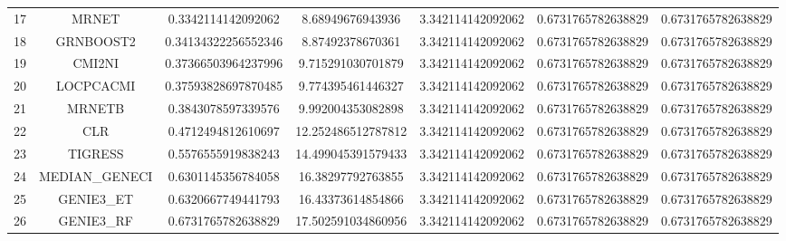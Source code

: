 \documentclass[a4paper,10pt]{article}
\begin{document}
\begin{landscape}
\begin{table}[!htp]
\begin{tabular}{ccccccc}
17&MRNET&0.3342114142092062&8.68949676943936&3.342114142092062&0.6731765782638829&0.6731765782638829\\
18&GRNBOOST2&0.34134322256552346&8.87492378670361&3.342114142092062&0.6731765782638829&0.6731765782638829\\
19&CMI2NI&0.37366503964237996&9.715291030701879&3.342114142092062&0.6731765782638829&0.6731765782638829\\
20&LOCPCACMI&0.37593828697870485&9.774395461446327&3.342114142092062&0.6731765782638829&0.6731765782638829\\
21&MRNETB&0.3843078597339576&9.992004353082898&3.342114142092062&0.6731765782638829&0.6731765782638829\\
22&CLR&0.4712494812610697&12.252486512787812&3.342114142092062&0.6731765782638829&0.6731765782638829\\
23&TIGRESS&0.5576555919838243&14.499045391579433&3.342114142092062&0.6731765782638829&0.6731765782638829\\
24&MEDIAN_GENECI&0.6301145356784058&16.38297792763855&3.342114142092062&0.6731765782638829&0.6731765782638829\\
25&GENIE3_ET&0.6320667749441793&16.43373614854866&3.342114142092062&0.6731765782638829&0.6731765782638829\\
26&GENIE3_RF&0.6731765782638829&17.502591034860956&3.342114142092062&0.6731765782638829&0.6731765782638829\\
\hline
\end{tabular}
\end{table}


\end{landscape}
\end{document}
